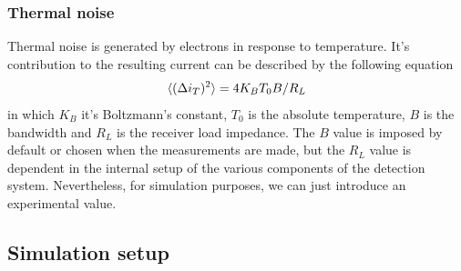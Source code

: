 \subsubsection{Thermal noise}
Thermal noise is generated by electrons in response to temperature. It's contribution to the resulting current can be described by the following equation
\cite{fox2006}
%
\begin{equation}
\braket{(\Delta i_T)^2} = 4 K_B T_0 B/R_L
\end{equation}
%
in which $K_B$ it's Boltzmann's constant, $T_0$ is the absolute temperature, $B$ is the bandwidth and $R_L$ is the receiver load impedance. The $B$ value is imposed by default or chosen when the measurements are made, but the $R_L$ value is dependent in the internal setup of the various components of the detection system. Nevertheless, for simulation purposes, we can just introduce an experimental value.\\
\vspace{1cm}
%
%
\subsection{Simulation setup}

